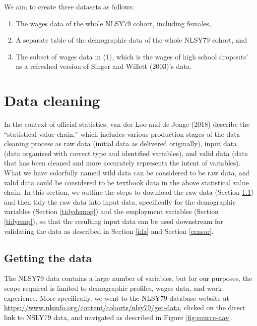 \documentclass[12pt]{article}
\providecommand{\tightlist}{%
  \setlength{\itemsep}{0pt}\setlength{\parskip}{0pt}}
\begin{document}
We aim to create three datasets as follows:

\begin{enumerate}
\def\labelenumi{\arabic{enumi}.}
\tightlist
\item
  The wages data of the whole NLSY79 cohort, including females,
\item
  A separate table of the demographic data of the whole NLSY79 cohort, and
\item
  The subset of wages data in (1), which is the wages of high school dropouts' as a refreshed version of Singer and Willett (2003)'s data.
\end{enumerate}

\hypertarget{cleaning}{%
\section{Data cleaning}\label{cleaning}}

In the context of official statistics, van der Loo and de Jonge (2018) describe the ``statistical value chain,'' which includes various production stages of the data cleaning process as raw data (initial data as delivered originally), input data (data organized with correct type and identified variables), and valid data (data that has been cleaned and more accurately represents the intent of variables). What we have colorfully named wild data can be considered to be raw data, and valid data could be considered to be textbook data in the above statistical value chain. In this section, we outline the steps to download the raw data (Section \ref{getdata}) and then tidy the raw data into input data, specifically for the demographic variables (Section \ref{tidydemog}) and the employment variables (Section \ref{tidyemp}), so that the resulting input data can be used downstream for validating the data as described in Section \ref{ida} and Section \ref{censor}.

\hypertarget{getdata}{%
\subsection{Getting the data}\label{getdata}}

The NLSY79 data contains a large number of variables, but for our purposes, the scope required is limited to demographic profiles, wages data, and work experience. More specifically, we went to the NLSY79 database website at \url{https://www.nlsinfo.org/content/cohorts/nlsy79/get-data}, clicked on the direct link to NSLY79 data, and navigated as described in Figure \ref{fig:source-nav}.
\end{document}

